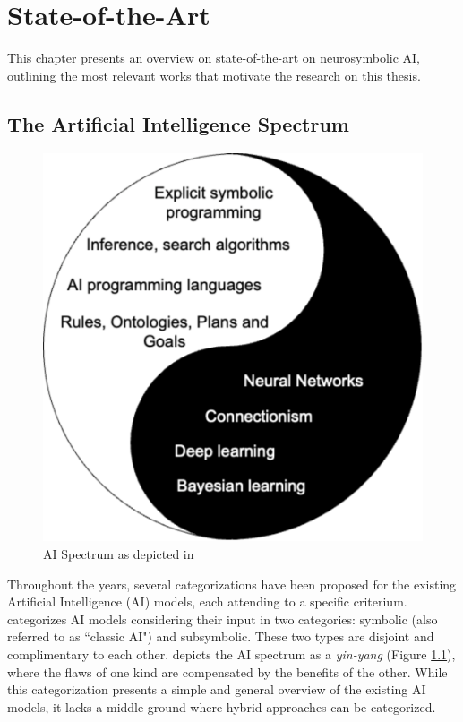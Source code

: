 \chapter{State-of-the-Art}
\label{chap:soa}
This chapter presents an overview on state-of-the-art on neurosymbolic AI, outlining the most relevant works that motivate the research on this thesis.
\section{The Artificial Intelligence Spectrum} \label{sec:the_ai_spectrum}

\begin{figure}[t]
    \centering
    \includegraphics[width=.5\linewidth]{2_stateoftheart/figures/Lieberman_taxonomy.eps}
    \caption{AI Spectrum as depicted in \cite{lieberman_symbolic_nodate}}
    \label{fig:lieberman_tax}
\end{figure}

Throughout the years, several categorizations have been proposed for the existing Artificial Intelligence (AI) models, each attending to a specific criterium. \cite{lieberman_symbolic_nodate} categorizes AI models considering their input in two categories: symbolic (also referred to as ``classic AI") and subsymbolic. These two types are disjoint and complimentary to each other. \cite{lieberman_symbolic_nodate} depicts the AI spectrum as a \textit{yin-yang} (Figure \ref{fig:lieberman_tax}), where the flaws of one kind are compensated by the benefits of the other. While this categorization presents a simple and general overview of the existing AI models, it lacks a middle ground where hybrid approaches can be categorized. 

